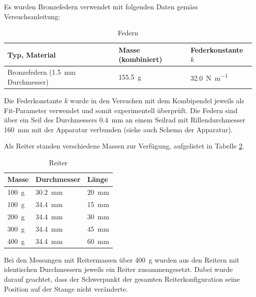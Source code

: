 Es wurden Bronzefedern verwendet mit folgenden Daten gem\"ass Versuchsanleitung:
\begin{table}[h!]
    \centering
    \caption{Federn}
    \label{tab:springs}
    \begin{tabular}{lll}
        \toprule
        Typ, Material & Masse (kombiniert) & Federkonstante $k$ \\
        \midrule
        Bronzefedern (\SI{1.5}{\milli\meter} Durchmesser) & \SI{155.5}{\gram} & \SI{32.0}{\newton\per\meter} \\
        \bottomrule
    \end{tabular}
\end{table}

Die Federkonstante $k$ wurde in den  Versuchen mit dem Kombipendel jeweils als
Fit-Parameter verwendet und somit experimentell \"uberpr\"uft. Die Federn sind
\"uber ein Seil  des Durchmessers \SI{0.4}{\milli\meter} an  einem Seilrad mit
Rillendurchmesser \SI{160}{\milli\meter} mit der Apparatur verbunden (siehe auch
Schema der Apparatur).

Als Reiter standen verschiedene Massen zur Verf\"ugung, aufgelistet in Tabelle \ref{tab:riders}.

\begin{table}[h!]
    \centering
    \caption{Reiter}
    \label{tab:riders}
    \begin{tabular}{lll}
        \toprule
        Masse& Durchmesser  & L\"ange  \\
        \midrule
        \SI{100}{\gram} & \SI{30.2}{\milli\meter} & \SI{20}{\milli\meter} \\
        \SI{100}{\gram} & \SI{34.4}{\milli\meter} & \SI{15}{\milli\meter} \\
        \SI{200}{\gram} & \SI{34.4}{\milli\meter} & \SI{30}{\milli\meter} \\
        \SI{300}{\gram} & \SI{34.4}{\milli\meter} & \SI{45}{\milli\meter} \\
        \SI{400}{\gram} & \SI{34.4}{\milli\meter} & \SI{60}{\milli\meter} \\
        \bottomrule
    \end{tabular}
\end{table}

Bei  den Messungen  mit  Reitermassen \"uber  \SI{400}{\gram}  wurden aus  den
Reitern mit identischen Durchmessern jeweils ein Reiter zusammengesetzt. Dabei
wurde darauf  geachtet, dass der Schwerpunkt  der gesamten Reiterkonfiguration
seine Position auf der Stange nicht ver\"anderte.


